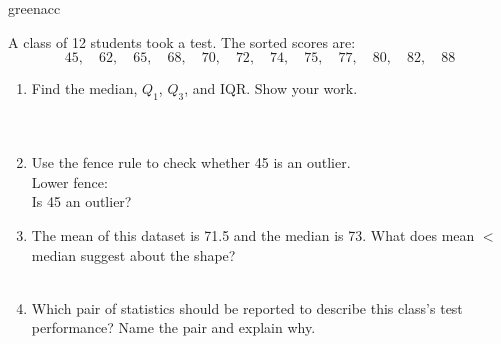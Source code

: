 \documentclass[10pt]{article}
\begin{document}
\vspace{0.12in}

\begin{blurbbox}{greenacc}
\small

A class of 12 students took a test. The sorted scores are:
\[45,\quad 62,\quad 65,\quad 68,\quad 70,\quad 72,\quad 74,\quad 75,\quad 77,\quad 80,\quad 82,\quad 88\]

\begin{enumerate}[leftmargin=1.5em, itemsep=8pt]

  \item Find the median, $Q_1$, $Q_3$, and IQR. Show your work.\\[5pt]
        \writeline\\[1pt]\writeline\\[1pt]\writeline

  \item Use the fence rule to check whether 45 is an outlier.\\[5pt]
        Lower fence: \blank{5cm}\\[4pt]
        Is 45 an outlier? \blank{3cm}

  \item The mean of this dataset is 71.5 and the median is 73.
        What does mean $<$ median suggest about the shape?\\[5pt]
        \writeline\\[1pt]\writeline

  \item Which pair of statistics should be reported to describe this class's
        test performance? Name the pair and explain why.\\[5pt]
        \writeline\\[1pt]\writeline

\end{enumerate}

\end{blurbbox}

\vspace{0.12in}
\end{document}
